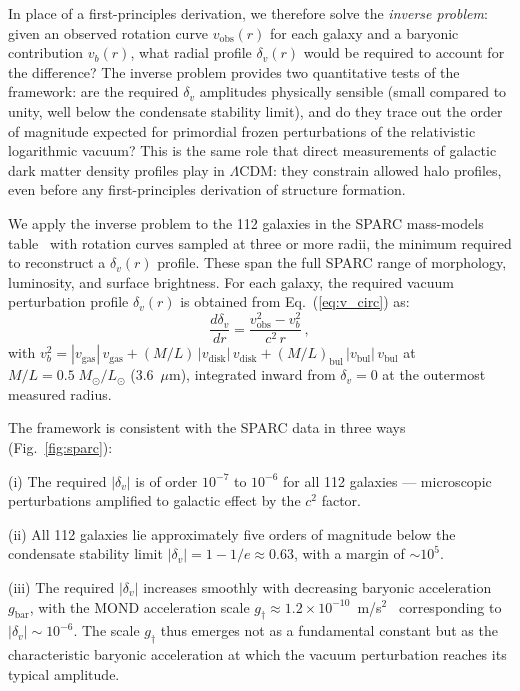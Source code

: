 \documentclass[12pt, a4paper]{article}
\begin{document}
In place of a first-principles derivation, we therefore solve the \emph{inverse problem}: given an observed rotation curve $v_\mathrm{obs}(r)$ for each galaxy and a baryonic contribution $v_b(r)$, what radial profile $\delta_v(r)$ would be required to account for the difference? The inverse problem provides two quantitative tests of the framework: are the required $\delta_v$ amplitudes physically sensible (small compared to unity, well below the condensate stability limit), and do they trace out the order of magnitude expected for primordial frozen perturbations of the relativistic logarithmic vacuum? This is the same role that direct measurements of galactic dark matter density profiles play in $\Lambda$CDM: they constrain allowed halo profiles, even before any first-principles derivation of structure formation.

We apply the inverse problem to the 112 galaxies in the SPARC mass-models table~\cite{sparc} with rotation curves sampled at three or more radii, the minimum required to reconstruct a $\delta_v(r)$ profile. These span the full SPARC range of morphology, luminosity, and surface brightness. For each galaxy, the required vacuum perturbation profile $\delta_v(r)$ is obtained from Eq.~(\ref{eq:v_circ}) as:
\begin{equation}
    \frac{d\delta_v}{dr} = \frac{v_{\mathrm{obs}}^2 - v_b^2}{c^2\,r}\,,
\label{eq:delta_v_inverse}
\end{equation}
with $v_b^2 = |v_{\mathrm{gas}}|\,v_{\mathrm{gas}} + (M/L)\,|v_{\mathrm{disk}}|\,v_{\mathrm{disk}} + (M/L)_{\mathrm{bul}}\,|v_{\mathrm{bul}}|\,v_{\mathrm{bul}}$ at $M/L = 0.5\;M_\odot/L_\odot$ (3.6~$\mu$m), integrated inward from $\delta_v = 0$ at the outermost measured radius.

The framework is consistent with the SPARC data in three ways (Fig.~\ref{fig:sparc}):

(i) The required $|\delta_v|$ is of order $10^{-7}$ to $10^{-6}$ for all 112 galaxies --- microscopic perturbations amplified to galactic effect by the $c^2$ factor.

(ii) All 112 galaxies lie approximately five orders of magnitude below the condensate stability limit $|\delta_v| = 1 - 1/e \approx 0.63$, with a margin of $\sim 10^5$.

(iii) The required $|\delta_v|$ increases smoothly with decreasing baryonic acceleration $g_{\mathrm{bar}}$, with the MOND acceleration scale $g_\dagger \approx 1.2 \times 10^{-10}$~m/s$^2$~\cite{mcgaugh_2016} corresponding to $|\delta_v| \sim 10^{-6}$. The scale $g_\dagger$ thus emerges not as a fundamental constant but as the characteristic baryonic acceleration at which the vacuum perturbation reaches its typical amplitude.
\end{document}
